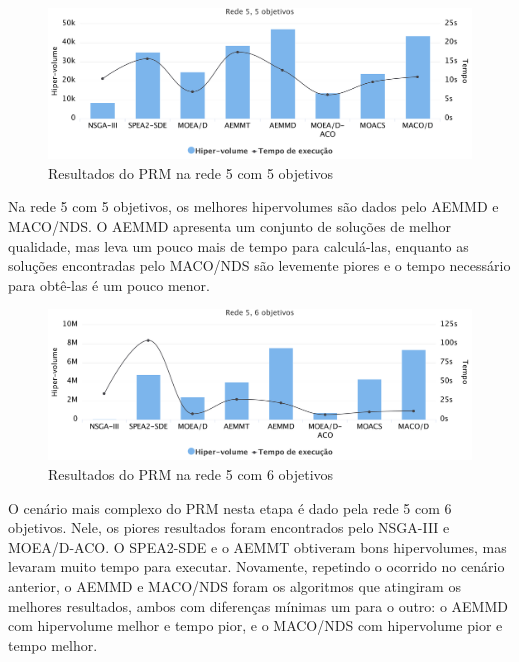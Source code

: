 \begin{figure}[!htbp]	
	\includegraphics[width=1\textwidth]{cap_experimentos/figs/etapa4/r5o5}
	\caption{\label{fig_exp4_r5o5}Resultados do PRM na rede 5 com 5 objetivos}
\end{figure}

Na rede 5 com 5 objetivos, os melhores hipervolumes são dados pelo AEMMD e MACO/NDS. O AEMMD apresenta um conjunto de soluções de melhor qualidade, mas leva um pouco mais de tempo para calculá-las, enquanto as soluções encontradas pelo MACO/NDS são levemente piores e o tempo necessário para obtê-las é um pouco menor.

\begin{figure}[!htbp]	
	\includegraphics[width=1\textwidth]{cap_experimentos/figs/etapa4/r5o6}
	\caption{\label{fig_exp4_r5o6}Resultados do PRM na rede 5 com 6 objetivos}
\end{figure}

O cenário mais complexo do PRM nesta etapa é dado pela rede 5 com 6 objetivos. Nele, os piores resultados foram encontrados pelo NSGA-III e MOEA/D-ACO. O SPEA2-SDE e o AEMMT obtiveram bons hipervolumes, mas levaram muito tempo para executar. Novamente, repetindo o ocorrido no cenário anterior, o AEMMD e MACO/NDS foram os algoritmos que atingiram os melhores resultados, ambos com diferenças mínimas um para o outro: o AEMMD com hipervolume melhor e tempo pior, e o MACO/NDS com hipervolume pior e tempo melhor.

